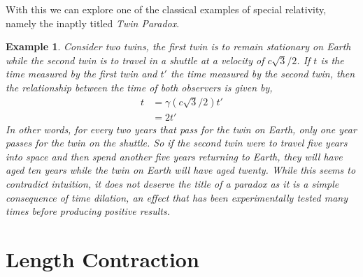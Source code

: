 \documentclass[a4paper,12pt,draft]{report}
\newtheorem{example}{Example}
\begin{document}
With this we can explore one of the classical examples of special relativity, namely the inaptly titled \emph{Twin Paradox}.
\begin{example}
Consider two twins, the first twin is to remain stationary on Earth while the second twin is to travel in a shuttle at a velocity of $c\sqrt{3}/2$. If $t$ is the time measured by the first twin and $t'$ the time measured by the second twin, then the relationship between the time of both observers is given by,
$$
\begin{aligned}
t & = \gamma\left(c\sqrt{3}/2\right)t'\\
& = 2t'
\end{aligned}
$$
In other words, for every two years that pass for the twin on Earth, only one year passes for the twin on the shuttle. So if the second twin were to travel five years into space and then spend another five years returning to Earth, they will have aged ten years while the twin on Earth will have aged twenty. While this seems to contradict intuition, it does not deserve the title of a paradox as it is a simple consequence of time dilation, an effect that has been experimentally tested many times before producing positive results.
\end{example}

\section{Length Contraction}
\end{document}

